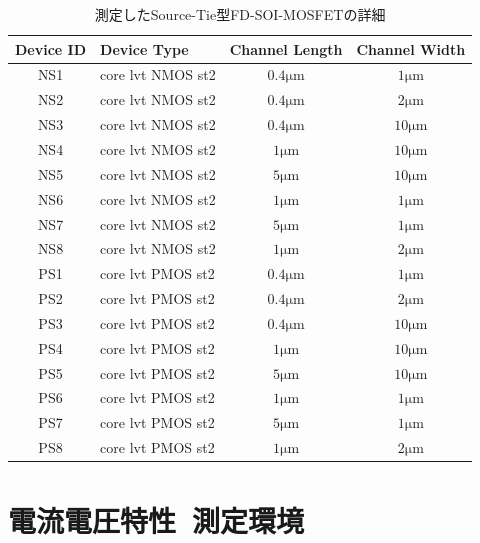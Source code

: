 		\begin{table}[htb]
			\begin{center}
				\begin{tabular}{| c | l | c | c |} \hline
					Device ID & Device Type & Channel Length & Channel Width \\ \hline \hline
					NS1 & core lvt NMOS st2 & $0.4 \mathrm{\mu m}$ & $1 \mathrm{\mu m}$ \\ \hline
					NS2 & core lvt NMOS st2 & $0.4 \mathrm{\mu m}$ & $2 \mathrm{\mu m}$ \\ \hline
					NS3 & core lvt NMOS st2 & $0.4 \mathrm{\mu m}$ & $10 \mathrm{\mu m}$ \\ \hline
					NS4 & core lvt NMOS st2 & $1 \mathrm{\mu m}$ & $10 \mathrm{\mu m}$ \\ \hline
					NS5 & core lvt NMOS st2 & $5 \mathrm{\mu m}$ & $10 \mathrm{\mu m}$ \\ \hline
					NS6 & core lvt NMOS st2 & $1 \mathrm{\mu m}$ & $1 \mathrm{\mu m}$ \\ \hline
					NS7 & core lvt NMOS st2 & $5 \mathrm{\mu m}$ & $1 \mathrm{\mu m}$ \\ \hline
					NS8 & core lvt NMOS st2 & $1 \mathrm{\mu m}$ & $2 \mathrm{\mu m}$ \\ \hline \hline
					PS1 & core lvt PMOS st2 & $0.4 \mathrm{\mu m}$ & $1 \mathrm{\mu m}$ \\ \hline
					PS2 & core lvt PMOS st2 & $0.4 \mathrm{\mu m}$ & $2 \mathrm{\mu m}$ \\ \hline
					PS3 & core lvt PMOS st2 & $0.4 \mathrm{\mu m}$ & $10 \mathrm{\mu m}$ \\ \hline
					PS4 & core lvt PMOS st2 & $1 \mathrm{\mu m}$ & $10 \mathrm{\mu m}$ \\ \hline
					PS5 & core lvt PMOS st2 & $5 \mathrm{\mu m}$ & $10 \mathrm{\mu m}$ \\ \hline
					PS6 & core lvt PMOS st2 & $1 \mathrm{\mu m}$ & $1 \mathrm{\mu m}$ \\ \hline
					PS7 & core lvt PMOS st2 & $5 \mathrm{\mu m}$ & $1 \mathrm{\mu m}$ \\ \hline
					PS8 & core lvt PMOS st2 & $1 \mathrm{\mu m}$ & $2 \mathrm{\mu m}$ \\ \hline
				\end{tabular}
				\caption{測定したSource-Tie型FD-SOI-MOSFETの詳細}
				\label{tab:ST_detail}
			\end{center}
		\end{table}
		\clearpage

	\section{電流電圧特性\ 測定環境}
